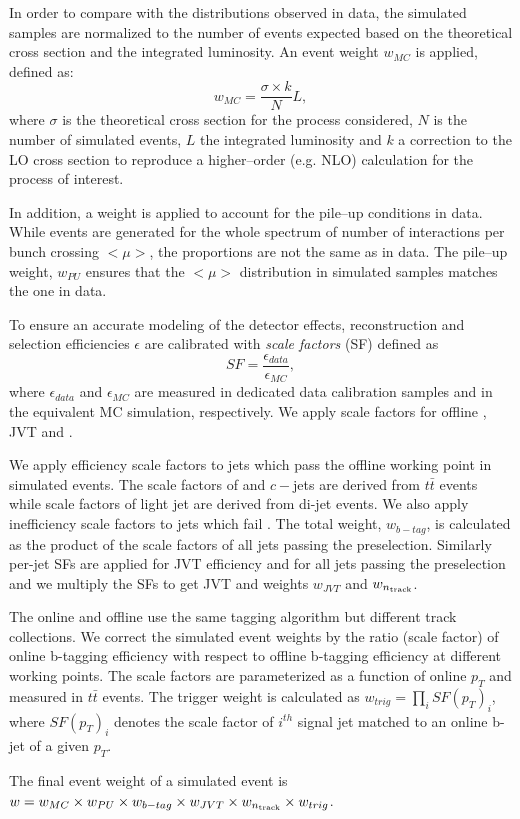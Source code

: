 In order to compare with the distributions observed in data, the simulated samples are normalized
to the number of events expected based on the theoretical cross section and the integrated luminosity.
An event weight $w_{MC}$ is applied, defined as:
\begin{equation}\label{eq:mcweight}
w_{MC} = \frac{\sigma\times k}{N} L,
\end{equation}
where $\sigma$ is the theoretical cross section for the process considered, $N$ is the
number of simulated events, $L$ the integrated luminosity and $k$ a
correction to the LO cross section to reproduce a higher--order
(e.g. NLO) calculation for the process of interest.

In addition, a weight is applied  to account for the pile--up
conditions in data. While events are generated for the whole spectrum
of number of interactions per bunch crossing $<\mu>$, the proportions
are not the same as in data. The pile--up weight, $w_{PU}$ ensures that the
$<\mu>$ distribution in simulated samples matches the one in data.

To ensure an accurate modeling of the detector effects, reconstruction
and selection efficiencies $\epsilon$ are calibrated with {\it scale factors}
(SF) defined as 
\begin{equation}
SF = \frac{\epsilon_{data}}{\epsilon_{MC}},
\end{equation}
where $\epsilon_{data}$ and $\epsilon_{MC}$ are measured in dedicated
data calibration samples and in the equivalent MC simulation, respectively.
We apply scale factors for offline \btagging, JVT and \ntrk. 

We apply efficiency scale factors to jets which pass the offline \btagging working point in simulated events. 
The scale factors of \bjets and $c-$jets are derived from $t\bar t$ events while scale factors of light jet are derived from di-jet events. 
We also apply inefficiency scale factors to jets which fail \btagging. The total \btagging weight, $w_{b-tag}$, is calculated as the product of the scale factors of all jets passing the preselection. Similarly per-jet SFs are applied for JVT efficiency and \ntrk for all jets passing the preselection and we multiply the SFs to get JVT and \ntrk weights $w_{JVT}$ and $w_{n_{\text{track}}}$.

The online \btagging and offline \btagging use the same tagging algorithm but different track collections. 
We correct the simulated event weights by the ratio (scale factor) of online b-tagging efficiency with respect to offline b-tagging efficiency at different working points. 
The scale factors are parameterized as a function of online \bjet $p_T$ and measured in $t\bar t$ events. 
The trigger weight is calculated as $w_{trig} = \prod_{i} SF(p_T)_{i}$, where $SF(p_T)_i$ denotes the scale factor of $i^{th}$ signal jet matched to an online b-jet of a given $p_T$. 

The final event weight of a simulated event is $w = w_{MC}\times w_{PU} \times w_{b-tag} \times w_{JVT} \times w_{n_{\text{track}}} \times w_{trig}$. 



